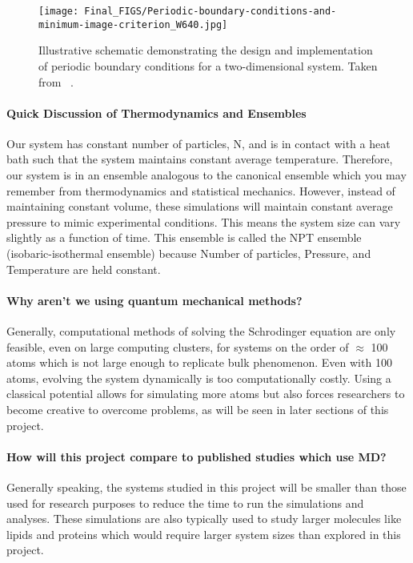 \documentclass{article}
\begin{document}
\begin{figure}[H]
    \centering
    \texttt{[image: Final\_FIGS/Periodic-boundary-conditions-and-minimum-image-criterion\_W640.jpg]}
    \caption{Illustrative schematic demonstrating the design and implementation of periodic boundary conditions for a two-dimensional system. Taken from ~\cite{Bamer_ACME_2023}.}
    \label{fig:pbc}
\end{figure}

\paragraph{Quick Discussion of Thermodynamics and Ensembles} Our system has constant number of particles, N, and is in contact with a heat bath such that the system maintains constant average temperature. Therefore, our system is in an ensemble analogous to the canonical ensemble which you may remember from thermodynamics and statistical mechanics. However, instead of maintaining constant volume, these simulations will maintain constant average pressure to mimic experimental conditions. This means the system size can vary slightly as a function of time. This ensemble is called the NPT ensemble (isobaric-isothermal ensemble) because Number of particles, Pressure, and Temperature are held constant.

\paragraph{Why aren't we using quantum mechanical methods?} Generally, computational methods of solving the Schrodinger equation are only feasible, even on large computing clusters, for systems on the order of $\approx$ 100 atoms which is not large enough to replicate bulk phenomenon. Even with 100 atoms, evolving the system dynamically is too computationally costly. Using a classical potential allows for simulating more atoms but also forces researchers to become creative to overcome problems, as will be seen in later sections of this project.

\paragraph{How will this project compare to published studies which use MD?} Generally speaking, the systems studied in this project will be smaller than those used for research purposes to reduce the time to run the simulations and analyses. These simulations are also typically used to study larger molecules like lipids and proteins which would require larger system sizes than explored in this project.
\end{document}
